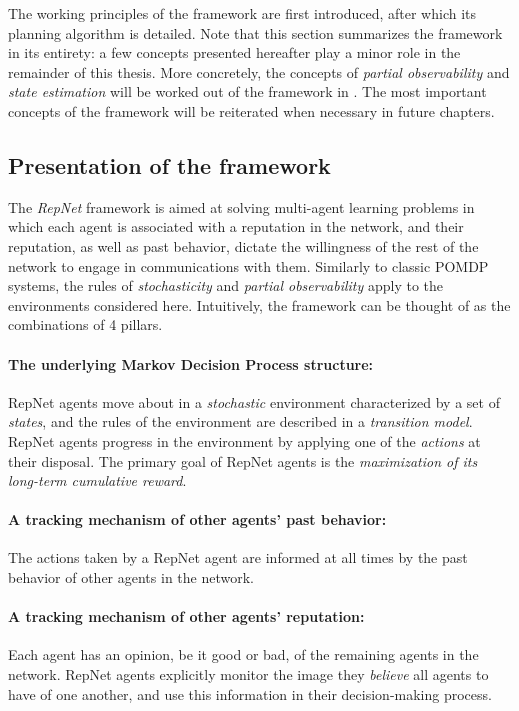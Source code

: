 The working principles of the framework are first introduced, after which its planning algorithm is detailed. Note that this section summarizes the framework in its entirety: a few concepts presented hereafter play a minor role in the remainder of this thesis. More concretely, the concepts of \textit{partial observability} and \textit{state estimation} will be worked out of the framework in . The most important concepts of the framework will be reiterated when necessary in future chapters. 


\subsection{Presentation of the framework}
The \textit{RepNet} framework is aimed at solving multi-agent learning problems in which each agent is associated with a reputation in the network, and their reputation, as well as past behavior, dictate the willingness of the rest of the network to engage in communications with them. Similarly to classic POMDP systems, the rules of \textit{stochasticity} and \textit{partial observability} apply to the environments considered here.
Intuitively, the framework can be thought of as the combinations of 4 pillars.

    \paragraph{The underlying Markov Decision Process structure:} RepNet agents move about in a \textit{stochastic} environment characterized by a set of \textit{states}, and the rules of the environment are described in a \textit{transition model}. RepNet agents progress in the environment by applying one of the \textit{actions} at their disposal. The primary goal of RepNet agents is the \textit{maximization of its long-term cumulative reward}.
    
    \paragraph{A tracking mechanism of other agents' past behavior:} The actions taken by a RepNet agent are informed at all times by the past behavior of other agents in the network.
    
    \paragraph{A tracking mechanism of other agents' reputation:} Each agent has an opinion, be it good or bad, of the remaining agents in the network. RepNet agents explicitly monitor the image they \textit{believe} all agents to have of one another, and use this information in their decision-making process.
    
